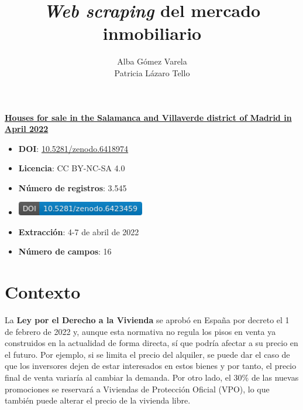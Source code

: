 \documentclass[12pt]{article}
\title{\textit{Web scraping} del mercado inmobiliario}
\author{Alba Gómez Varela\\Patricia Lázaro Tello}
\date{}	%
\begin{document}

\maketitle
\thispagestyle{uoc}

\begin{framed}
	\textbf{\underline{Houses for sale in the Salamanca and Villaverde district of Madrid in April 2022}}
	\begin{multicols}{2}
		\begin{itemize}[topsep=0cm,partopsep=0cm,label={},wide]
			\item \textbf{DOI}: \href{https://doi.org/10.5281/zenodo.6423459}{10.5281/zenodo.6418974}
			\item \textbf{Licencia}: CC BY-NC-SA 4.0
			\item \textbf{Número de registros}: 3.545
			\columnbreak
			\item \includegraphics[height=0.6cm]{zenodo.6423459}
			\item \textbf{Extracción}: 4-7 de abril de 2022
			\item \textbf{Número de campos}: 16
		\end{itemize}
	\end{multicols}
\end{framed}

\vspace{-2em}

\section{Contexto}\label{contexto}\vspace{-1.0em}

La \textbf{Ley por el Derecho a la Vivienda} se aprobó en España por decreto el 1 de febrero de 2022 y, aunque esta normativa no regula los pisos en venta ya construidos en la actualidad de forma directa, sí que podría afectar a su precio en el futuro. Por ejemplo, si se limita el precio del alquiler, se puede dar el caso de que los inversores dejen de estar interesados en estos bienes y por tanto, el precio final de venta variaría al cambiar la demanda. Por otro lado, el 30\% de las nuevas promociones se reservará a Viviendas de Protección Oficial (VPO), lo que también puede alterar el precio de la vivienda libre.
\end{document}
